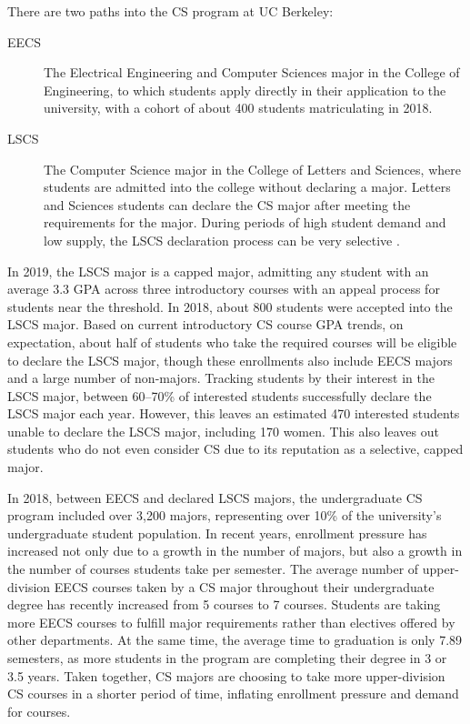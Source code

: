 There are two paths into the CS program at UC Berkeley:
\begin{description}
\item[EECS] The Electrical Engineering and Computer Sciences major in the College of Engineering, to which students apply directly in their application to the university, with a cohort of about 400 students matriculating in 2018.
\item[LSCS] The Computer Science major in the College of Letters and Sciences, where students are admitted into the college without declaring a major. Letters and Sciences students can declare the CS major after meeting the requirements for the major. During periods of high student demand and low supply, the LSCS declaration process can be very selective \cite{Roberts:2016, Alivisatos:2017}.
\end{description}
In 2019, the LSCS major is a capped major, admitting any student with an average 3.3 GPA across three introductory courses with an appeal process for students near the threshold. In 2018, about 800 students were accepted into the LSCS major. Based on current introductory CS course GPA trends, on expectation, about half of students who take the required courses will be eligible to declare the LSCS major, though these enrollments also include EECS majors and a large number of non-majors. Tracking students by their interest in the LSCS major, between 60--70\% of interested students successfully declare the LSCS major each year. However, this leaves an estimated 470 interested students unable to declare the LSCS major, including 170 women. This also leaves out students who do not even consider CS due to its reputation as a selective, capped major.

In 2018, between EECS and declared LSCS majors, the undergraduate CS program included over 3,200 majors, representing over 10\% of the university's undergraduate student population. In recent years, enrollment pressure has increased not only due to a growth in the number of majors, but also a growth in the number of courses students take per semester. The average number of upper-division EECS courses taken by a CS major throughout their undergraduate degree has recently increased from 5 courses to 7 courses. Students are taking more EECS courses to fulfill major requirements rather than electives offered by other departments. At the same time, the average time to graduation is only 7.89 semesters, as more students in the program are completing their degree in 3 or 3.5 years. Taken together, CS majors are choosing to take more upper-division CS courses in a shorter period of time, inflating enrollment pressure and demand for courses.

